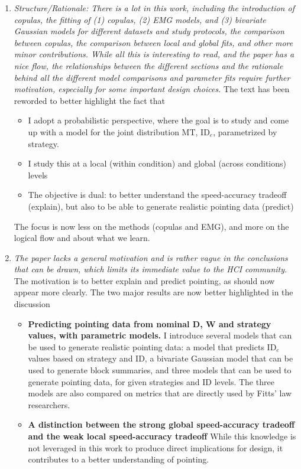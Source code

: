 \documentclass{article}
\begin{document}
\begin{enumerate}
    \item \textit{Structure/Rationale: There is a lot in this work, including the introduction of copulas, the fitting of (1) copulas, (2) EMG models, and (3) bivariate Gaussian models for different datasets and study protocols, the comparison between copulas, the comparison between local and global fits, and other more minor contributions. While all this is interesting to read, and the paper has a nice flow, the relationships between the different sections and the rationale behind all the different model comparisons and parameter fits require further motivation, especially for some important design choices.} The text has been reworded to better highlight the fact that
        \begin{itemize}
            \item I adopt a probabilistic perspective, where the goal is to study and come up with a model for the joint distribution MT, ID$_e$, parametrized by strategy.
            \item I study this at a local (within condition) and global (across conditions) levels
            \item The objective is dual: to better understand the speed-accuracy tradeoff (explain), but also to be able to generate realistic pointing data (predict)
        \end{itemize}
    The focus is now less on the methods (copulas and EMG), and more on the logical flow and about what we learn.
    \item  \textit{The paper lacks a general motivation and is rather vague in the conclusions that can be drawn, which limits its immediate value to the HCI community.} The motivation is to better explain and predict pointing, as should now appear more clearly. The two major results are now better highlighted in the discussion
        \begin{itemize}
            \item \textbf{Predicting pointing data from nominal D, W and strategy values, with parametric models.} I introduce several models that can be used to generate realistic pointing data: a model that predicts ID$_e$ values based on strategy and ID, a bivariate Gaussian model that can be used to generate block summaries, and three models that can be used to generate pointing data, for given strategies and ID levels. The three models are also compared on metrics that are directly used by Fitts' law researchers.
            \item \textbf{A distinction between the strong global speed-accuracy tradeoff and the weak local speed-accuracy tradeoff} While this knowledge is not leveraged in this work to produce direct implications for design, it contributes to a better understanding of pointing.

\end{itemize}
\end{enumerate}
\end{document}
